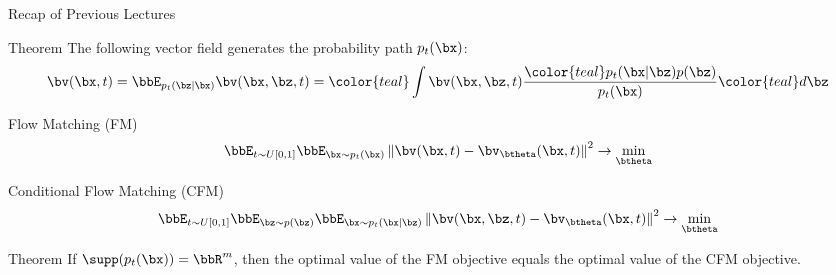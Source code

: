 \documentclass{beamer}
\begin{document}
\begin{frame}{Recap of Previous Lectures}
	\begin{block}{Theorem}
		The following vector field generates the probability path $p_t(\bx)$:
		\vspace{-0.2cm}
		\[
			\bv(\bx, t) = \bbE_{p_t(\bz | \bx)} \bv(\bx, \bz, t)  = {\color{teal}\int \bv(\bx, \bz, t)} \frac{\color{teal}p_t(\bx | \bz) p(\bz)}{p_t(\bx)} {\color{teal}d \bz}
		\]
		\vspace{-0.5cm}
	\end{block}
	\begin{block}{Flow Matching (FM)}
		\vspace{-0.5cm}
		\[
			\bbE_{t \sim U[0, 1]} \bbE_{\bx \sim p_t(\bx)}\left\| \bv(\bx, t) - \bv_{\btheta}(\bx, t) \right\|^2 \rightarrow \min_{\btheta}
		\]
		\vspace{-0.5cm}
	\end{block}
	\begin{block}{Conditional Flow Matching (CFM)}
		\vspace{-0.5cm}
		\[
			\bbE_{t \sim U[0, 1]} \bbE_{\bz \sim p(\bz)} \bbE_{\bx \sim p_t(\bx | \bz)}\left\| \bv(\bx, \bz, t) - \bv_{\btheta}(\bx, t) \right\|^2 \rightarrow \min_{\btheta}
		\]
		\vspace{-0.7cm}
	\end{block}
	\begin{block}{Theorem}
		If $\supp(p_t(\bx)) = \bbR^m$, then the optimal value of the FM objective equals the optimal value of the CFM objective.
	\end{block}
\end{frame}
\end{document}
